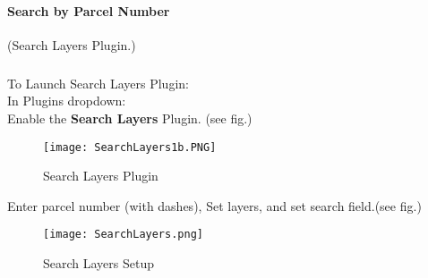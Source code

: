 \paragraph{Search by Parcel Number}
\small (Search Layers Plugin.)
\subparagraph*{}
To Launch Search Layers Plugin:\\In Plugins dropdown:\\Enable the \textbf{Search Layers} Plugin. (see fig.)
\begin{figure}[H]
\begin{center}
\texttt{[image: SearchLayers1b.PNG]}
\end{center}
\caption{Search Layers Plugin}
\end{figure}
\bigskip
Enter parcel number {\tiny (with dashes)}, Set layers, and set search field.(see fig.)
\begin{figure}[H]
\begin{center}
\texttt{[image: SearchLayers.png]}
\end{center}
\caption{Search Layers Setup}
\end{figure}

\clearpage


